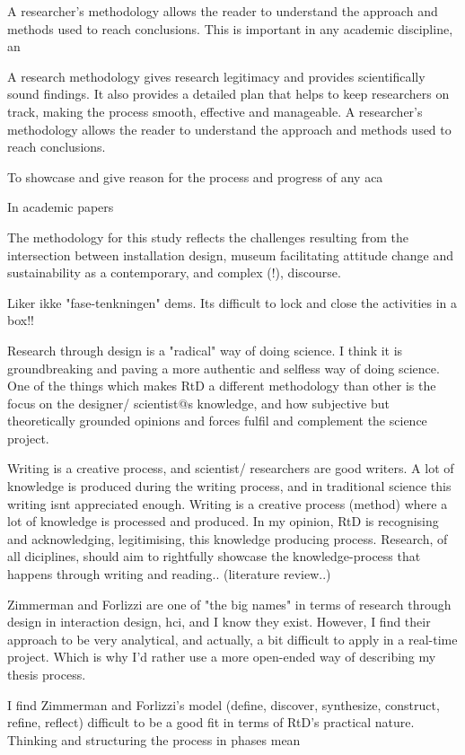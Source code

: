 A researcher's methodology allows the reader to understand the approach and methods used to reach conclusions. This is important in any academic discipline, an

A research methodology gives research legitimacy and provides scientifically sound findings. It also provides a detailed plan that helps to keep researchers on track, making the process smooth, effective and manageable. A researcher's methodology allows the reader to understand the approach and methods used to reach conclusions.

To showcase and give reason for the process and progress of any aca

In academic papers



The methodology for this study reflects the challenges resulting from the intersection between installation design, museum facilitating attitude change and sustainability as a contemporary, and complex (!), discourse. 

Liker ikke "fase-tenkningen" dems. Its difficult to lock and close the activities in a box!!

Research through design is a "radical" way of doing science. I think it is groundbreaking and paving a more authentic and selfless way of doing science. One of the things which makes RtD a different methodology than other is the focus on the designer/ scientist@s knowledge, and how subjective but theoretically grounded opinions and forces fulfil and complement the science project. 

Writing is a creative process, and scientist/ researchers are good writers. A lot of knowledge is produced during the writing process, and in traditional science this writing isnt appreciated enough. Writing is a creative process (method) where a lot of knowledge is processed and produced. In my opinion, RtD is recognising and acknowledging, legitimising, this knowledge producing process. Research, of all diciplines, should aim to rightfully showcase the knowledge-process that happens through writing and reading..  (literature review..)

Zimmerman and Forlizzi are one of "the big names" in terms of research through design in interaction design, hci, and I know they exist. However, I find their approach to be very analytical, and actually, a bit difficult to apply in a real-time project. Which is why I'd rather use a more open-ended way of describing my thesis process. 

I find Zimmerman and Forlizzi's model (define, discover, synthesize, construct, refine, reflect) difficult to be a good fit in terms of RtD's practical nature. Thinking and structuring the process in phases mean 



